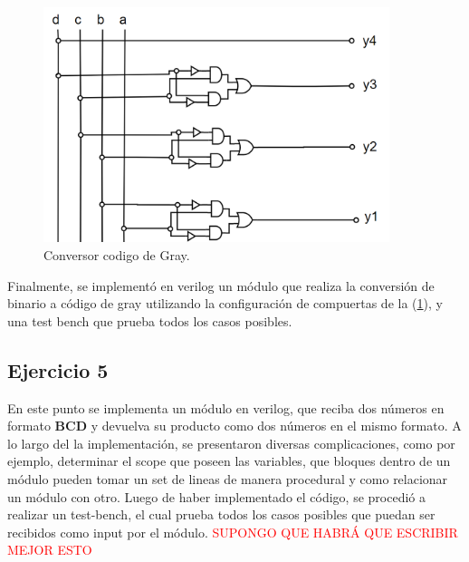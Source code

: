\documentclass[a4paper]{article}
\begin{document}
\begin{figure}[H]
	\centering
	\includegraphics[width=0.9\textwidth]{Circuito3.png}
	\caption{Conversor codigo de Gray.}
	\label{fig:circ3}
\end{figure}
Finalmente, se implementó en verilog un módulo que realiza la conversión de binario a código de gray utilizando la configuración de compuertas de la (\ref{fig:circ3}),
y una test bench que prueba todos los casos posibles.


\subsection*{Ejercicio 5}
En este punto se implementa un módulo en verilog, que reciba dos números en formato \textbf{BCD} y devuelva su producto como dos números en el mismo formato.
A lo largo del la implementación, se presentaron diversas complicaciones, como por ejemplo, determinar el scope que poseen las variables, que bloques dentro de un módulo pueden tomar un set de lineas de manera procedural y como relacionar un módulo con otro.
Luego de haber implementado el código, se procedió a realizar un test-bench, el cual prueba todos los casos posibles que puedan ser recibidos como input por el módulo.
\center \textcolor{red}{SUPONGO QUE HABRÁ QUE ESCRIBIR MEJOR ESTO}
\end{document}
